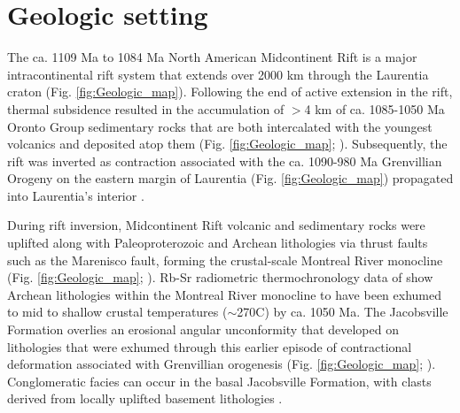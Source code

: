 \documentclass[draft]{agujournal2019}
\begin{document}
\section*{Geologic setting}

The ca. 1109 Ma to 1084 Ma North American Midcontinent Rift is a major intracontinental rift system that extends over 2000 km through the Laurentia craton (Fig. \ref{fig:Geologic_map}). Following the end of active extension in the rift, thermal subsidence resulted in the accumulation of $>$4 km of ca. 1085-1050 Ma Oronto Group sedimentary rocks that are both intercalated with the youngest volcanics and deposited atop them (Fig. \ref{fig:Geologic_map}; ). Subsequently, the rift was inverted as contraction associated with the ca. 1090-980 Ma Grenvillian Orogeny on the eastern margin of Laurentia (Fig. \ref{fig:Geologic_map}) propagated into Laurentia's interior \cite{Cannon1993a, Cannon1994a, Hodgin2022a, Swanson-Hysell2023a}. 

During rift inversion, Midcontinent Rift volcanic and sedimentary rocks were uplifted along with Paleoproterozoic and Archean lithologies via thrust faults such as the Marenisco fault, forming the crustal-scale Montreal River monocline (Fig. \ref{fig:Geologic_map}; ). Rb-Sr radiometric thermochronology data of  show Archean lithologies within the Montreal River monocline to have been exhumed to mid to shallow crustal temperatures ($\sim$270\textdegree C) by ca. 1050 Ma. The Jacobsville Formation overlies an erosional angular unconformity that developed on lithologies that were exhumed through this earlier episode of contractional deformation associated with Grenvillian orogenesis (Fig. \ref{fig:Geologic_map}; ). Conglomeratic facies can occur in the basal Jacobsville Formation, with clasts derived from locally uplifted basement lithologies \cite{Irving1885a, Hamblin1958a, Kalliokoski1982a, Alemu2023a}. 
\end{document}
